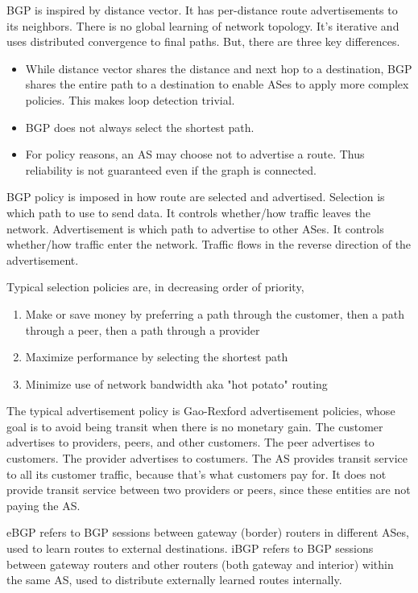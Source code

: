 BGP is inspired by distance vector. It has per-distance route advertisements to
its neighbors. There is no global learning of network topology. It's iterative
and uses distributed convergence to final paths. But, there are three key differences.

\begin{itemize}
      \item While distance vector shares the distance and next hop to a destination,
            BGP shares the entire path to a destination to enable ASes to apply more
            complex policies. This makes loop detection trivial.
      \item BGP does not always select the shortest path.
      \item For policy reasons, an AS may choose not to advertise a route. Thus
            reliability is not guaranteed even if the graph is connected.
\end{itemize}

BGP policy is imposed in how route are selected and advertised. Selection
is which path to use to send data. It controls whether/how traffic leaves
the network. Advertisement is which path to advertise to other ASes. It
controls whether/how traffic enter the network. Traffic flows in the reverse
direction of the advertisement.

Typical selection policies are, in decreasing order of priority,
\begin{enumerate}
      \item Make or save money by preferring a path through the customer,
            then a path through a peer, then a path through a provider
      \item Maximize performance by selecting the shortest path
      \item Minimize use of network bandwidth aka "hot potato" routing
\end{enumerate}

The typical advertisement policy is Gao-Rexford advertisement policies,
whose goal is to avoid being transit when there is no monetary gain.
The customer advertises to providers, peers, and other customers. The
peer advertises to customers. The provider advertises to costumers.
The AS provides transit service to all its customer traffic, because that's
what customers pay for. It does not provide transit service between two
providers or peers, since these entities are not paying the AS.

eBGP refers to  BGP sessions between gateway (border) routers in
different ASes, used to learn routes to external destinations.
iBGP refers to BGP sessions between gateway routers and other
routers (both gateway and interior) within the same AS, used to
distribute externally learned routes internally.

